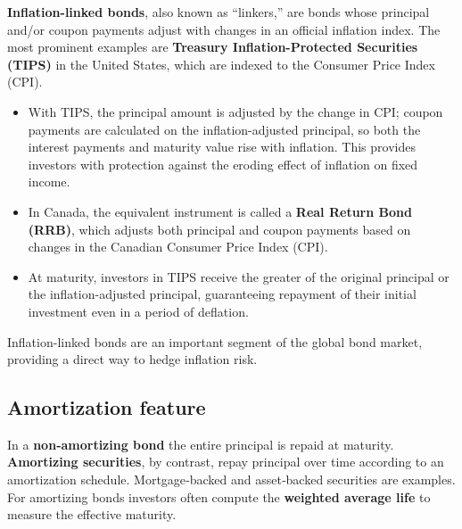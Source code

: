 \documentclass[
  letterpaper,
  DIV=11,
  numbers=noendperiod]{scrartcl}
\providecommand{\tightlist}{%
  \setlength{\itemsep}{0pt}\setlength{\parskip}{0pt}}
\begin{document}
\begin{tcolorbox}[enhanced jigsaw, titlerule=0mm, rightrule=.15mm, bottomtitle=1mm, colframe=quarto-callout-note-color-frame, opacitybacktitle=0.6, coltitle=black, breakable, toprule=.15mm, title=\textcolor{quarto-callout-note-color}{\faInfo}\hspace{0.5em}{Inflation-Linked Bonds: TIPS and Linkers}, leftrule=.75mm, colbacktitle=quarto-callout-note-color!10!white, left=2mm, arc=.35mm, opacityback=0, toptitle=1mm, bottomrule=.15mm, colback=white]

\textbf{Inflation-linked bonds}, also known as ``linkers,'' are bonds
whose principal and/or coupon payments adjust with changes in an
official inflation index. The most prominent examples are
\textbf{Treasury Inflation-Protected Securities (TIPS)} in the United
States, which are indexed to the Consumer Price Index (CPI).

\begin{itemize}
\tightlist
\item
  With TIPS, the principal amount is adjusted by the change in CPI;
  coupon payments are calculated on the inflation-adjusted principal, so
  both the interest payments and maturity value rise with inflation.
  This provides investors with protection against the eroding effect of
  inflation on fixed income.
\item
  In Canada, the equivalent instrument is called a \textbf{Real Return
  Bond (RRB)}, which adjusts both principal and coupon payments based on
  changes in the Canadian Consumer Price Index (CPI).
\item
  At maturity, investors in TIPS receive the greater of the original
  principal or the inflation-adjusted principal, guaranteeing repayment
  of their initial investment even in a period of deflation.
\end{itemize}

Inflation-linked bonds are an important segment of the global bond
market, providing a direct way to hedge inflation risk.

\end{tcolorbox}

\subsection{Amortization feature}\label{amortization-feature}

In a \textbf{non‑amortizing bond} the entire principal is repaid at
maturity. \textbf{Amortizing securities}, by contrast, repay principal
over time according to an amortization schedule. Mortgage‑backed and
asset‑backed securities are examples. For amortizing bonds investors
often compute the \textbf{weighted average life} to measure the
effective maturity.
\end{document}
